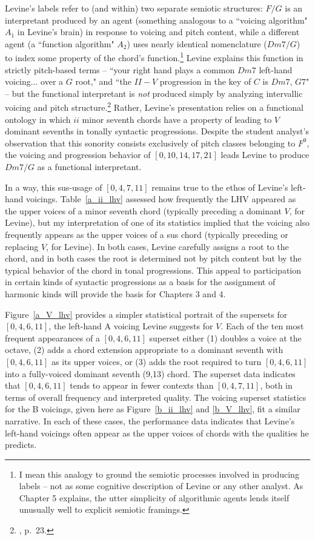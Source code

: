 Levine's labels refer to (and within) two separate semiotic structures: $F/G$ is an interpretant produced by an agent (something analogous to a ``voicing algorithm" $A_1$ in Levine's brain) in response to voicing and pitch content, while a different agent (a ``function algorithm" $A_2$) uses nearly identical nomenclature ($Dm7/G$) to index some property of the chord's function.\footnote{I mean this analogy to ground the semiotic processes involved in producing labels -- not as some cognitive description of Levine or any other analyst.  As Chapter 5 explains, the utter simplicity of algorithmic agents lends itself unusually well to explicit semiotic framings.}  Levine explains this function in strictly pitch-based terms -- ``your right hand plays a common $Dm7$ left-hand voicing... over a $G$ root," and ``the $II-V$ progression in the key of $C$ is $Dm7$, $G7$" -- but the functional interpretant is \emph{not} produced simply by analyzing intervallic voicing and pitch structure.\footnote{\cite{levine1989}, p.\ 23.}  Rather, Levine's presentation relies on a functional ontology in which $ii$ minor seventh chords have a property of leading to $V$ dominant sevenths in tonally syntactic progressions.   Despite the student analyst's observation that this sonority consists exclusively of pitch classes belonging to $F^9$, the voicing and progression behavior of $[0,10,14,17,21]$ leads Levine to produce $Dm7/G$ as a functional interpretant.  

In a way, this sus-usage of $[0,4,7,11]$ remains true to the ethos of Levine's left-hand voicings.  Table~\ref{a_ii_lhv} assessed how frequently the LHV appeared as the upper voices of a minor seventh chord (typically preceding a dominant $V$, for Levine), but my interpretation of one of its statistics implied that the voicing also frequently appears as the upper voices of a sus chord (typically preceding or replacing $V$, for Levine).  In both cases, Levine carefully assigns a root to the chord, and in both cases the root is determined not by pitch content but by the typical behavior of the chord in tonal progressions.  This appeal to participation in certain kinds of syntactic progressions as a basis for the assignment of harmonic kinds will provide the basis for Chapters 3 and 4.

Figure~\ref{a_V_lhv} provides a simpler statistical portrait of the supersets for $[0,4,6,11]$, the left-hand A voicing Levine suggests for $V$.  Each of the ten most frequent appearances of a $[0,4,6,11]$ superset either (1) doubles a voice at the octave, (2) adds a chord extension appropriate to a dominant seventh with $[0,4,6,11]$ as its upper voices, or (3) adds the root required to turn $[0,4,6,11]$ into a fully-voiced dominant seventh (9,13) chord.  The superset data indicates that $[0,4,6,11]$ tends to appear in fewer contexts than $[0,4,7,11]$, both in terms of overall frequency and interpreted quality.  The voicing superset statistics for the B voicings, given here as Figure~\ref{b_ii_lhv} and \ref{b_V_lhv}, fit a similar narrative.  In each of these cases, the performance data indicates that Levine's left-hand voicings often appear as the upper voices of chords with the qualities he predicts.

